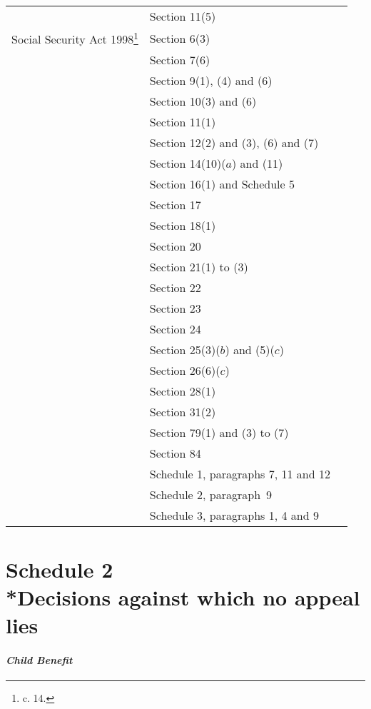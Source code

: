 \documentclass[12pt,a4paper]{article}
\begin{document}
{\begin{longtable}{p{150pt}p{102pt}p{102pt}}
&Section 11(5)\\
Social Security Act 1998\footnote{\frenchspacing 1998 c. 14.}&Section 6(3)\\
&Section 7(6)\\
&Section 9(1), (4) and (6)\\
&Section 10(3) and (6)\\
&Section 11(1)\\
&Section 12(2) and (3), (6) and (7)\\
&Section 14(10)($a$) and (11)\\
&Section 16(1) and Schedule 5\\
&Section 17\\
&Section 18(1)\\
&Section 20\\
&Section 21(1) to (3)\\
&Section 22\\
&Section 23\\
&Section 24\\
&Section 25(3)($b$) and (5)($c$)\\
&Section 26(6)($c$)\\
&Section 28(1)\\
&Section 31(2)\\
&Section 79(1) and (3) to (7)\\
&Section 84\\
&Schedule 1, paragraphs 7, 11 and 12\\
&Schedule 2, paragraph~9\\
&Schedule 3, paragraphs 1, 4 and 9\\
\end{longtable}

}

\part[Schedule 2 --- Decisions against which no appeal lies]{Schedule 2\\*Decisions against which no appeal lies}

\renewcommand\parthead{--- Schedule 2}


\subsection*{\itshape Child Benefit}
\end{document}
